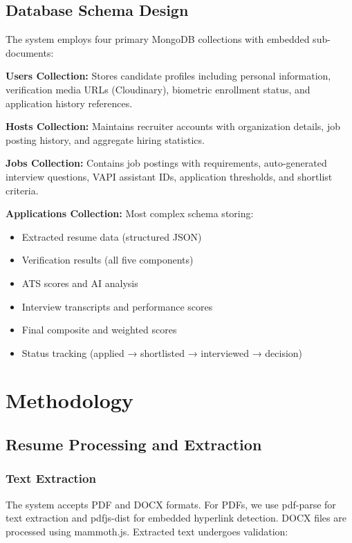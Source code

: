 \documentclass[conference]{IEEEtran}
\begin{document}
\subsection{Database Schema Design}

The system employs four primary MongoDB collections with embedded sub-documents:

\textbf{Users Collection:} Stores candidate profiles including personal information, verification media URLs (Cloudinary), biometric enrollment status, and application history references.

\textbf{Hosts Collection:} Maintains recruiter accounts with organization details, job posting history, and aggregate hiring statistics.

\textbf{Jobs Collection:} Contains job postings with requirements, auto-generated interview questions, VAPI assistant IDs, application thresholds, and shortlist criteria.

\textbf{Applications Collection:} Most complex schema storing:
\begin{itemize}
    \item Extracted resume data (structured JSON)
    \item Verification results (all five components)
    \item ATS scores and AI analysis
    \item Interview transcripts and performance scores
    \item Final composite and weighted scores
    \item Status tracking (applied → shortlisted → interviewed → decision)
\end{itemize}

\section{Methodology}

\subsection{Resume Processing and Extraction}

\subsubsection{Text Extraction}

The system accepts PDF and DOCX formats. For PDFs, we use pdf-parse for text extraction and pdfjs-dist for embedded hyperlink detection. DOCX files are processed using mammoth.js. Extracted text undergoes validation:
\end{document}
